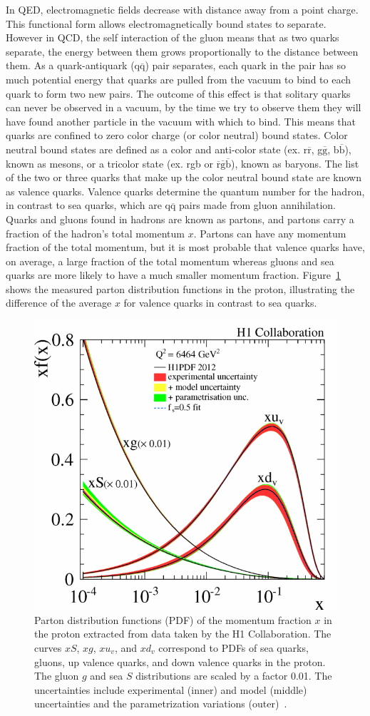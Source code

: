 In QED, electromagnetic fields decrease with distance away from a point charge. This functional form allows electromagnetically bound states to separate.
However in QCD, the self interaction of the gluon means that as two quarks separate, the energy between them grows proportionally to the distance between them. As a
quark-antiquark (q$\overline{\text{q}}$) pair separates, each quark in the pair has so much potential energy that quarks are pulled from the vacuum to bind to each quark to form two new pairs. The outcome of this effect is that solitary quarks can never be observed in a vacuum, by the time we try to observe them they will have found another particle in the vacuum with which to bind. This means that quarks are confined to zero color charge (or color neutral) bound states. Color neutral bound states are defined as a color and anti-color state  (ex. r$\overline{\text{r}}$, g$\overline{\text{g}}$, b$\overline{\text{b}}$),  known as mesons, or a tricolor state (ex. rgb or $\overline{\text{r}}\overline{\text{g}}\overline{\text{b}}$), known as baryons. The list of the two or three quarks that make up the color neutral bound state are known as valence quarks. Valence quarks determine the quantum number for the hadron, in contrast to sea quarks, which are q$\overline{\text{q}}$ pairs made from gluon annihilation. Quarks and gluons found in hadrons are known as partons, and partons carry a fraction of the hadron's total momentum $x$. Partons can have any momentum fraction of the total momentum, but it is most probable that valence quarks have, on average, a large fraction of the total momentum whereas gluons and sea quarks are more likely to have a much smaller momentum fraction. Figure~\ref{fig:pdf_plot_ch1} shows the measured parton distribution functions in the proton, illustrating the difference of the average $x$ for valence quarks in contrast to sea quarks.

\begin{figure}[!ht]
\centering
\includegraphics[width=0.45\linewidth]{figs/parton_distribution.png}
\caption{Parton distribution functions (PDF) of the momentum fraction $x$ in the proton extracted from data taken by the H1 Collaboration. The curves $xS$, $xg$, $xu_v$, and $xd_v$ correspond to PDFs of sea quarks, gluons, up valence quarks, and down valence quarks in the proton. The gluon $g$ and sea $S$ distributions are scaled by a factor 0.01. The uncertainties include experimental (inner) and model (middle) uncertainties and the parametrization variations (outer)~\cite{Aaron2012}.}
\label{fig:pdf_plot_ch1}
\end{figure}

